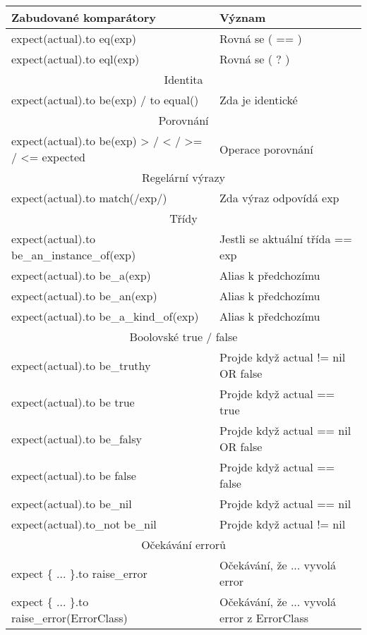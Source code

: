 \begin{longtable}{| p{} | p{} |} 
 \hline\hline
 Zabudované komparátory & Význam \\ 
 \hline
 expect(actual).to eq(exp) & Rovná se ( == ) \\
 \hline
 expect(actual).to eql(exp) & Rovná se ( ? ) \\
 \hline\hline
 \multicolumn{2}{||c||}{Identita}\\
 \hline
 expect(actual).to be(exp) / to equal() & Zda je identické\\
 \hline\hline
 \multicolumn{2}{||c||}{Porovnání}\\
 \hline
 expect(actual).to be(exp) > / < / >= / <= expected & Operace porovnání \\
 \hline\hline
 \multicolumn{2}{||c||}{Regelární výrazy}\\
 \hline
 expect(actual).to match(/exp/) & Zda výraz odpovídá exp \\
 \hline\hline
 \multicolumn{2}{||c||}{Třídy}\\
 \hline\hline
 expect(actual).to be\_an\_instance\_of(exp) & Jestli se aktuální třída == exp \\
 \hline
 expect(actual).to be\_a(exp) & Alias k předchozímu \\
 \hline
 expect(actual).to be\_an(exp) & Alias k předchozímu  \\
 \hline
 expect(actual).to be\_a\_kind\_of(exp) & Alias k předchozímu  \\
 \hline
 \multicolumn{2}{||c||}{Boolovské true / false}\\
 \hline\hline
 expect(actual).to be\_truthy  & Projde když actual != nil OR false\\
 \hline
 expect(actual).to be true    & Projde když actual == true \\
 \hline
 expect(actual).to be\_falsy   & Projde když actual == nil OR false \\
 \hline
 expect(actual).to be false   & Projde když actual == false \\
 \hline
 expect(actual).to be\_nil     & Projde když actual == nil \\
 \hline
 expect(actual).to\_not be\_nil & Projde když actual != nil \\
 \hline
 \multicolumn{2}{||c||}{Očekávání errorů}\\
 \hline\hline
 expect \{ ... \}.to raise\_error & Očekávání, že ... vyvolá error \\
 \hline
 expect \{ ... \}.to raise\_error(ErrorClass) & Očekávání, že ... vyvolá error z ErrorClass\\

\end{longtable}
